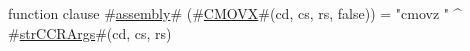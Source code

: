 function clause #\hyperref[sailMIPSzassembly]{assembly}# (#\hyperref[sailMIPSzCMOVX]{CMOVX}#(cd, cs, rs, false)) = "cmovz " ^ #\hyperref[sailMIPSzstrCCRArgs]{strCCRArgs}#(cd, cs, rs)
